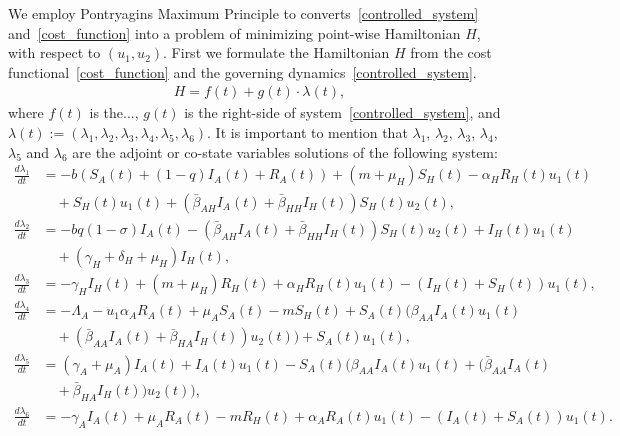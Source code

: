 \documentclass[3p,sort&compress]{elsarticle}
\DeclareRobustCommand{\1}[1]{\ensuremath \mathbbm{1}_{\{#1\}}}
\begin{document}
    We employ Pontryagins Maximum Principle to converts~\eqref{controlled_system} and~\eqref{cost_function} into a problem of minimizing point-wise Hamiltonian $H$, with respect to $(u_{1},u_{2})$. First we formulate the Hamiltonian $H$ from the cost functional~\eqref{cost_function} and the governing dynamics~\eqref{controlled_system}.
    \begin{equation}
        \begin{aligned}
            H = f(t) + g(t)\cdot \lambda(t),
         \end{aligned}
    \end{equation}
    where $f(t)$ is the..., $g(t)$ is the right-side of system~\eqref{controlled_system}, and $\lambda(t) := \left( \lambda_{1}, \lambda_{2}, \lambda_{3}, \lambda_{4}, \lambda_{5}, \lambda_{6} \right)$. It is important to mention that $\lambda_{1}$, $\lambda_{2}$, $\lambda_{3}$, $\lambda_{4}$, $\lambda_{5}$ and $\lambda_{6}$ are the adjoint or co-state variables solutions of the following system:
    \begin{equation}\label{adjoint_system}
    \begin{aligned}
        \frac{d \lambda_{1}}{dt} &=
        -b (S_{A}(t) + (1 - q) I_{A}(t) + R_{A}(t) ) + (m + \mu_{H}) S_{H}(t) - \alpha_{H} R_{H}(t) u_{1}(t)\\
        &\quad+ S_{H}(t) u_{1}(t) + (\bar{\beta}_{AH} I_{A}(t) + \bar{\beta}_{HH} I_{H}(t)) S_{H}(t) u_{2}(t),
        \\
        \frac{d \lambda_{2}}{dt} &=
        -b q (1 - \sigma) I_{A}(t) - (\bar{\beta}_{AH} I_{A}(t) + \bar{\beta}_{HH} I_{H}(t)) S_{H}(t) u_{2}(t)  + I_{H}(t) u_{1}(t)\\
        &\quad + (\gamma_{H} + \delta_{H} + \mu_{H}) I_{H}(t),
        \\
        \frac{d \lambda_{3}}{dt} &=
        -\gamma_{H} I_{H}(t) + (m + \mu_{H}) R_{H}(t) + \alpha_{H} R_{H}(t) u_{1}(t) - (I_{H}(t) + S_{H}(t)) u_{1}(t),
        \\[0.3cm]
        \frac{d \lambda_{4}}{dt} &=
        -\Lambda_{A} - u_{1} \alpha_{A} R_{A}(t) + \mu_{A} S_{A}(t) - m S_{H}(t) + S_{A}(t) (\beta_{AA} I_{A}(t) u_{1}(t)\\
        &\quad + (\bar{\beta}_{AA} I_{A}(t) + \bar{\beta}_{HA} I_{H}(t)) u_{2}(t)) + S_{A}(t) u_{1}(t),
        \\
        \frac{d \lambda_{5}}{dt} &=
        (\gamma_{A} + \mu_{A}) I_{A}(t) + I_{A}(t) u_{1}(t) - S_{A}(t) (\beta_{AA} I_{A}(t) u_{1}(t) + (\bar{\beta}_{AA} I_{A}(t)\\
        &\quad + \bar{\beta}_{HA} I_{H}(t)) u_{2}(t)),
        \\
        \frac{d \lambda_{6}}{dt} &=
        -\gamma_{A} I_{A}(t) + \mu_{A} R_{A}(t) - m R_{H}(t) + \alpha_{A} R_{A}(t) u_{1}(t) - (I_{A}(t) + S_{A}(t)) u_{1}(t).
    \end{aligned}
\end{equation}
\end{document}
